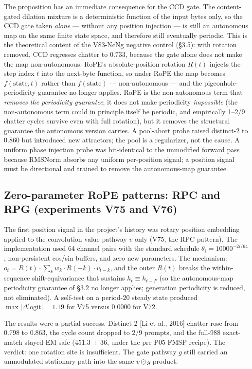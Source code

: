 \documentclass[11pt]{article}
\begin{document}
The proposition has an immediate consequence for the CCD gate. The content-gated dilation mixture is a deterministic function of the input bytes only, so the CCD gate taken \emph{alone} --- without any position injection --- is still an autonomous map on the same finite state space, and therefore still eventually periodic. This is the theoretical content of the V83-NcNg negative control (\S3.5): with rotation removed, CCD regresses chatter to 0.733, because the gate alone does not make the map non-autonomous. RoPE's absolute-position rotation $R(t)$ injects the step index $t$ into the next-byte function, so under RoPE the map becomes $f(\text{state}, t)$ rather than $f(\text{state})$ --- non-autonomous --- and the pigeonhole-periodicity guarantee no longer applies. RoPE is the non-autonomous term that \emph{removes the periodicity guarantee}; it does not make periodicity \emph{impossible} (the non-autonomous term could in principle itself be periodic, and empirically 1--2/9 chatter cycles survive even with full rotation), but it removes the structural guarantee the autonomous version carries. A pool-abort probe raised distinct-2 to 0.860 but introduced new attractors; the pool is a regularizer, not the cause. A uniform phase injection probe was bit-identical to the unmodified forward pass because RMSNorm absorbs any uniform per-position signal; a position signal must be directional and trained to remove the autonomous-map guarantee.

\subsection{Zero-parameter RoPE patterns: RPC and RPG (experiments V75 and V76)}

The first position signal in the project's history was rotary position embedding applied to the convolution value pathway $v$ only (V75, the RPC pattern). The implementation used 64 channel pairs with the standard schedule $\theta_i = 10000^{-2i/64}$, non-persistent cos/sin buffers, and zero new parameters. The mechanism: $o_t = R(t) \cdot \sum_k w_k \cdot R(-k) \cdot v_{t-k}$, and the outer $R(t)$ breaks the within-sequence shift-equivariance that sustains $h_t \equiv h_{t-P}$ (so the autonomous-map periodicity guarantee of \S3.2 no longer applies; generation periodicity is reduced, not eliminated). A self-test on a period-20 steady state produced $\max|\Delta \text{logit}| = 1.19$ for V75 versus 0.0000 for V72.

The results were a partial success. Distinct-2 [Li et al., 2016] chatter rose from 0.798 to 0.863, the cycle count dropped to 2/9 prompts, and the full-988 exact-match stayed EM-safe (451.3 $\pm$ 36, under the pre-P05 FMSP recipe). The verdict: one rotation site is insufficient. The gate pathway $g$ still carried an unmodulated stationary path into the same $v \odot g$ product.
\end{document}

